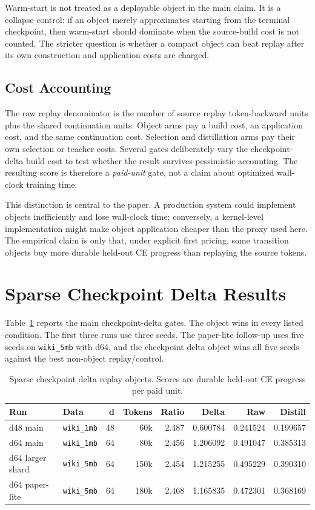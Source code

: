 \documentclass{article}
\begin{document}
Warm-start is not treated as a deployable object in the main claim. It is a
collapse control: if an object merely approximates starting from the terminal
checkpoint, then warm-start should dominate when the source-build cost is not
counted. The stricter question is whether a compact object can beat replay
after its own construction and application costs are charged.

\subsection{Cost Accounting}

The raw replay denominator is the number of source replay token-backward units
plus the shared continuation units. Object arms pay a build cost, an
application cost, and the same continuation cost. Selection and distillation
arms pay their own selection or teacher costs. Several gates deliberately vary
the checkpoint-delta build cost to test whether the result survives pessimistic
accounting. The resulting score is therefore a \emph{paid-unit} gate, not a
claim about optimized wall-clock training time.

This distinction is central to the paper. A production system could implement
objects inefficiently and lose wall-clock time; conversely, a kernel-level
implementation might make object application cheaper than the proxy used here.
The empirical claim is only that, under explicit first pricing, some transition
objects buy more durable held-out CE progress than replaying the source tokens.

\section{Sparse Checkpoint Delta Results}

Table~\ref{tab:checkpoint_delta_main} reports the main checkpoint-delta gates.
The object wins in every listed condition. The first three runs use three
seeds. The paper-lite follow-up uses five seeds on \texttt{wiki\_5mb} with
d64, and the checkpoint delta object wins all five seeds against the best
non-object replay/control.

\begin{table}[t]
  \centering
  \caption{Sparse checkpoint delta replay objects. Scores are durable held-out
  CE progress per paid unit.}
  \label{tab:checkpoint_delta_main}
  \begin{tabular}{llrrrrrr}
    \toprule
    Run & Data & d & Tokens & Ratio & Delta & Raw & Distill \\
    \midrule
    d48 main & \texttt{wiki\_1mb} & 48 & 60k & 2.487 & 0.600784 & 0.241524 & 0.199657 \\
    d64 main & \texttt{wiki\_1mb} & 64 & 80k & 2.456 & 1.206092 & 0.491047 & 0.385313 \\
    d64 larger shard & \texttt{wiki\_5mb} & 64 & 150k & 2.454 & 1.215255 & 0.495229 & 0.390310 \\
    d64 paper-lite & \texttt{wiki\_5mb} & 64 & 180k & 2.468 & 1.165835 & 0.472301 & 0.368169 \\
    \bottomrule
  \end{tabular}
\end{table}
\end{document}
